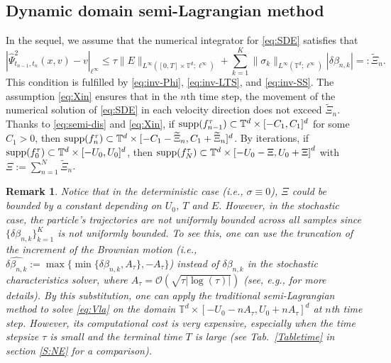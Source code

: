 \documentclass[11pt,reqno]{amsproc}
\newtheorem{remark}[Def]{Remark}
\numberwithin{equation}{section}
\begin{document}
\subsection{Dynamic domain semi-Lagrangian method}\label{S3.3}

In the sequel,
we assume that the numerical integrator for \eqref{eq:SDE} satisfies that
\begin{equation}\label{eq:Xin}
|\widehat{\Psi}^2_{t_{n-1},t_n}(x,v)-v|_{\ell^\infty}\le \tau \|E\|_{L^\infty([0,T]\times\mathbb{T}^d;\ell^\infty)}+\sum_{k=1}^{K}\|\sigma_k\|_{L^\infty(\mathbb{T}^d;\ell^\infty)}|\delta\beta_{n,k}|=:\widetilde\Xi_n.
\end{equation}
This condition is fulfilled by \eqref{eq:inv-Phi}, \eqref{eq:inv-LTS}, and \eqref{eq:inv-SS}. The assumption \eqref{eq:Xin} ensures that in the $n$th time step, the movement of the numerical solution of  \eqref{eq:SDE} in each velocity direction does not exceed $\widetilde\Xi_n$. 
Thanks to \eqref{eq:semi-dis} and \eqref{eq:Xin}, if $\textup{supp}(f_{n-1}^\tau)\subset\mathbb{T}^d\times[-C_1,C_1]^d$ for some $C_1>0$, then
$\textup{supp}(f^\tau_{n})\subset\mathbb{T}^d\times[-C_1-\widetilde\Xi_n,C_1+\widetilde\Xi_n]^d$.
By iterations, if $\textup{supp}(f_0^\tau)\subset\mathbb{T}^d\times[-U_0,U_0]^d$, then $\textup{supp}(f^\tau_{N})\subset\mathbb{T}^d\times\left[-U_0-\Xi,U_0+\Xi\right]^d$
with $\Xi:= \sum_{n=1}^{N}\widetilde\Xi_n$. 



 \begin{remark}\label{rem:1}
 Notice that in the deterministic case (i.e., $\sigma\equiv 0$), $\Xi$ could be bounded by a constant depending on $U_0$, $T$ and $E$.
However, in the stochastic case, the particle's trajectories are not uniformly bounded across all samples since $\{\delta\beta_{n,k}\}_{k=1}^{K}$ is not uniformly bounded. To see this, one can use 
the truncation of the increment of the Brownian motion (i.e., $\widehat{\delta \beta_{n,k}}:=\max\{\min\{\delta \beta_{n,k},A_\tau\},-A_\tau\}$)
 instead of $\delta \beta_{n,k}$ in the stochastic characteristics solver, where $A_\tau=\mathcal{O}(\sqrt{\tau|\log(\tau)|})$ (see, e.g., \cite{MT21} for more details). By this substitution, one can apply the traditional semi-Lagrangian method to solve \eqref{eq:Vla} on the domain $\mathbb{T}^d\times[-U_0-nA_\tau,U_0+nA_\tau]^d$ at $n$th time step. However, its computational cost is very expensive, especially when the time stepsize $\tau$ is small and the terminal time $T$ is large (see Tab.\ \ref{Tabletime} in section \ref{S:NE} for a comparison).
\end{remark}
\end{document}
